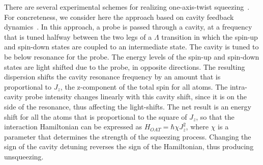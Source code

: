 \documentclass[aps,pra,letterpaper,superscriptaddress,showpacs,amsmath,floats,twocolumn]{revtex4-1}
\begin{document}
There are several experimental schemes for realizing one-axis-twist squeezing~\cite{Takeuchi,Schleier,Leroux1,Leroux2,Hosten,Antisqz,Antisqzexpt,Wang,Liu,Gil}. For concreteness, we consider here the approach based on cavity feedback dynamics~\cite{Schleier,Leroux1,Leroux2,Hosten,Antisqz,Antisqzexpt}. In this approach, a probe is passed through a cavity, at a frequency that is tuned halfway between the two legs of a $\Lambda$ transition in which the spin-up and spin-down states are coupled to an intermediate state. The cavity is tuned to be below resonance for the probe. The energy levels of the spin-up and spin-down states are light shifted due to the probe, in opposite directions. The resulting dispersion shifts the cavity resonance frequency by an amount that is proportional to $J_z$, the z-component of the total spin for all atoms. The intra-cavity probe intensity changes linearly with this cavity shift, since it is on the side of the resonance, thus affecting the light-shifts. The net result is an energy shift for all the atoms that is proportional to the square of $J_z$, so that the interaction Hamiltonian can be expressed as $H_{OAT} =\hbar \chi J_z^2$, where $\chi$ is a parameter that determines the strength of the squeezing process. Changing the sign of the cavity detuning reverses the sign of the Hamiltonian, thus producing unsqueezing. 
\end{document}
